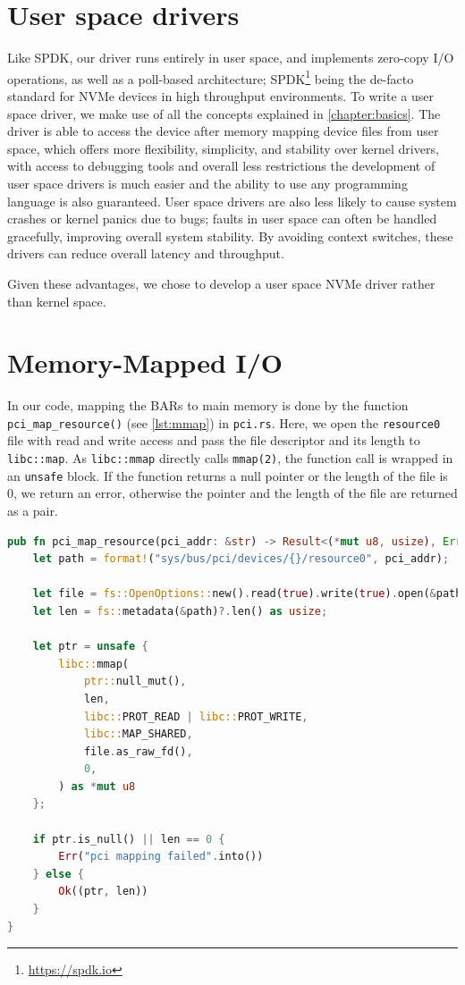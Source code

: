 \section{User space drivers}
Like SPDK, our driver runs entirely in user space, and implements zero-copy I/O operations, as well as a poll-based architecture; SPDK\footnote{\url{https://spdk.io}} being the de-facto standard for NVMe devices in high throughput environments. To write a user space driver, we make use of all the concepts explained in \autoref{chapter:basics}. The driver is able to access the device after memory mapping device files from user space, which offers more flexibility, simplicity, and stability over kernel drivers, with access to debugging tools and overall less restrictions the development of user space drivers is much easier and the ability to use any programming language is also guaranteed. User space drivers are also less likely to cause system crashes or kernel panics due to bugs; faults in user space can often be handled gracefully, improving overall system stability. By avoiding context switches, these drivers can reduce overall latency and throughput.

Given these advantages, we chose to develop a user space NVMe driver rather than kernel space.

\section{Memory-Mapped I/O}

In our code, mapping the BARs to main memory is done by the function \texttt{pci\_map\_resource()} (see \autoref{lst:mmap}) in \texttt{pci.rs}. Here, we open the \texttt{resource0} file with read and write access and pass the file descriptor and its length to \texttt{libc::map}. As \texttt{libc::mmap} directly calls \texttt{mmap(2)}, the function call is wrapped in an \texttt{unsafe} block. If the function returns a null pointer or the length of the file is 0, we return an error, otherwise the pointer and the length of the file are returned as a pair.

\begin{lstlisting}[float, language=Rust,label=lst:mmap,caption=Memory mapping a PCI resource in Rust]
pub fn pci_map_resource(pci_addr: &str) -> Result<(*mut u8, usize), Error> {
    let path = format!("sys/bus/pci/devices/{}/resource0", pci_addr);

    let file = fs::OpenOptions::new().read(true).write(true).open(&path)?;
    let len = fs::metadata(&path)?.len() as usize;

    let ptr = unsafe {
        libc::mmap(
            ptr::null_mut(),
            len,
            libc::PROT_READ | libc::PROT_WRITE,
            libc::MAP_SHARED,
            file.as_raw_fd(),
            0,
        ) as *mut u8
    };

    if ptr.is_null() || len == 0 {
        Err("pci mapping failed".into())
    } else {
        Ok((ptr, len))
    }
}
\end{lstlisting}

